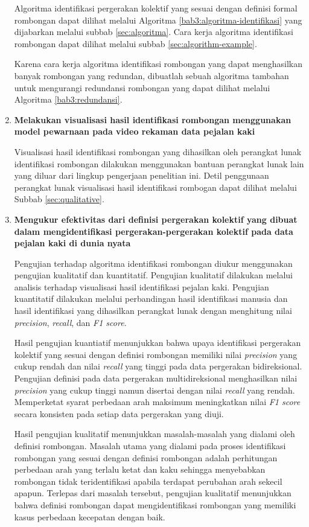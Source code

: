 \begin{enumerate}
    Algoritma identifikasi pergerakan kolektif yang sesuai dengan definisi formal rombongan dapat dilihat melalui Algoritma \ref{bab3:algoritma-identifikasi} yang dijabarkan melalui subbab \ref{sec:algoritma}. Cara kerja algoritma identifikasi rombongan dapat dilihat melalui subbab \ref{sec:algorithm-example}.
    
    Karena cara kerja algoritma identifikasi rombongan yang dapat menghasilkan banyak rombongan yang redundan, dibuatlah sebuah algoritma tambahan untuk mengurangi redundansi rombongan yang dapat dilihat melalui Algoritma \ref{bab3:redundansi}.
    
    \item \textbf{Melakukan visualisasi hasil identifikasi rombongan menggunakan model pewarnaan pada video rekaman data pejalan kaki}
    
    Visualisasi hasil identifikasi rombongan yang dihasilkan oleh perangkat lunak identifikasi rombongan dilakukan menggunakan bantuan perangkat lunak lain yang diluar dari lingkup pengerjaan penelitian ini. Detil penggunaan perangkat lunak visualisasi hasil identifikasi rombogan dapat dilihat melalui Subbab \ref{sec:qualitative}.
    
    \item \textbf{Mengukur efektivitas dari definisi pergerakan kolektif yang dibuat dalam mengidentifikasi pergerakan-pergerakan kolektif pada data pejalan kaki di dunia nyata}
    
    Pengujian terhadap algoritma identifikasi rombongan diukur menggunakan pengujian kualitatif dan kuantitatif. Pengujian kualitatif dilakukan melalui analisis terhadap visualisasi hasil identifikasi pejalan kaki. Pengujian kuantitatif dilakukan melalui perbandingan hasil identifikasi manusia dan hasil identifikasi yang dihasilkan perangkat lunak dengan menghitung nilai \textit{precision}, \textit{recall}, dan \textit{F1 score}.
    
    Hasil pengujian kuantiatif menunjukkan bahwa upaya identifikasi pergerakan kolektif yang sesuai dengan definisi rombongan memiliki nilai \textit{precision} yang cukup rendah dan nilai \textit{recall} yang tinggi pada data pergerakan bidireksional. Pengujian definisi pada data pergerakan multidireksional menghasilkan nilai \textit{precision} yang cukup tinggi namun disertai dengan nilai \textit{recall} yang rendah. Memperketat syarat perbedaan arah maksimum meningkatkan nilai \textit{F1 score} secara konsisten pada setiap data pergerakan yang diuji.
    
    Hasil pengujian kualitatif menunjukkan masalah-masalah yang dialami oleh definisi rombongan. Masalah utama yang dialami pada proses identifikasi rombongan yang sesuai dengan definisi rombongan adalah perhitungan perbedaan arah yang terlalu ketat dan kaku sehingga menyebabkan rombongan tidak teridentifikasi apabila terdapat perubahan arah sekecil apapun. Terlepas dari masalah tersebut, pengujian kualitatif menunjukkan bahwa definisi rombongan dapat mengidentifikasi rombongan yang memiliki kasus perbedaan kecepatan dengan baik.
\end{enumerate}

